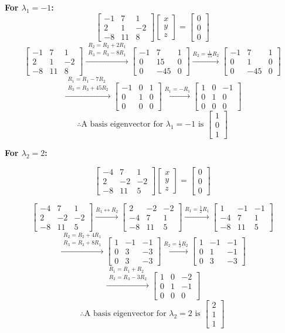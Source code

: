 \documentclass{article}
\newcommand{\mat}[1]{\begin{bmatrix} #1 \end{bmatrix}}
\newcommand{\vect}[1]{\begin{bmatrix} #1 \end{bmatrix}}
\begin{document}
\textbf{For $\lambda_1 = -1$:}
\[
	\mat{ -1 & 7 & 1 \\ 2 & 1 & -2 \\ -8 & 11 & 8 } \vect{x \\ y \\ z} = \vect{0 \\ 0 \\ 0}
\]
\[
	\mat{ -1 & 7 & 1 \\ 2 & 1 & -2 \\ -8 & 11 & 8 }
	\xrightarrow{\substack{R_2 = R_2 + 2R_1 \\ R_3 = R_3 - 8R_1}}
	\mat{ -1 & 7 & 1 \\ 0 & 15 & 0 \\ 0 & -45 & 0 }
	\xrightarrow{R_2 = \frac{1}{15}R_2}
	\mat{ -1 & 7 & 1 \\ 0 & 1 & 0 \\ 0 & -45 & 0 }
\]
\[
	\xrightarrow{\substack{R_1 = R_1 - 7R_2 \\ R_3 = R_3 + 45R_2}}
	\mat{ -1 & 0 & 1 \\ 0 & 1 & 0 \\ 0 & 0 & 0 }
	\xrightarrow{R_1 = -R_1}
	\mat{ 1 & 0 & -1 \\ 0 & 1 & 0 \\ 0 & 0 & 0 }
\]
\[
	\therefore \text{A basis eigenvector for } \lambda_1 = -1 \text{ is } \vect{1 \\ 0 \\ 1}
\]

\textbf{For $\lambda_2 = 2$:}

\[
	\mat{ -4 & 7 & 1 \\ 2 & -2 & -2 \\ -8 & 11 & 5 } \vect{x \\ y \\ z} = \vect{0 \\ 0 \\ 0}
\]

\[
	\mat{ -4 & 7 & 1 \\ 2 & -2 & -2 \\ -8 & 11 & 5 }
	\xrightarrow{R_1 \leftrightarrow R_2}
	\mat{ 2 & -2 & -2 \\ -4 & 7 & 1 \\ -8 & 11 & 5 }
	\xrightarrow{R_1 = \frac{1}{2}R_1}
	\mat{ 1 & -1 & -1 \\ -4 & 7 & 1 \\ -8 & 11 & 5 }
\]
\[
	\xrightarrow{\substack{R_2 = R_2 + 4R_1 \\ R_3 = R_3 + 8R_1}}
	\mat{ 1 & -1 & -1 \\ 0 & 3 & -3 \\ 0 & 3 & -3 }
	\xrightarrow{R_2 = \frac{1}{3}R_2}
	\mat{ 1 & -1 & -1 \\ 0 & 1 & -1 \\ 0 & 3 & -3 }
\]
\[
	\xrightarrow{\substack{R_1 = R_1 + R_2 \\ R_3 = R_3 - 3R_2}}
	\mat{ 1 & 0 & -2 \\ 0 & 1 & -1 \\ 0 & 0 & 0 }
\]
\[
	\therefore \text{A basis eigenvector for } \lambda_2 = 2 \text{ is } \vect{2 \\ 1 \\ 1}
\]
\end{document}
